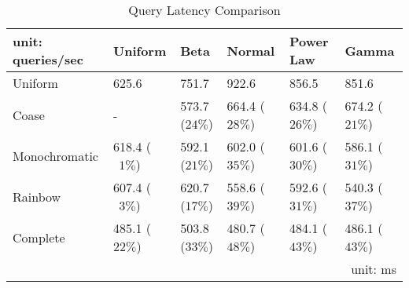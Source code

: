 \begin{table*}[t!]
\centering
\caption{Query Latency Comparison}
\begin{tabular}{llllll}
\toprule
unit: queries/sec &  Uniform &   Beta &  Normal &  Power Law &   Gamma \\
\midrule
Uniform          &   625.6             &  751.7          &  922.6              &    856.5             &  851.6 \\
Coase         &   -                 &  573.7 ($24\%$) &  664.4 ($28\%$)  &    634.8 ($26\%$) &  674.2 ($21\%$) \\
Monochromatic &   618.4 ($\ \ 1\%$) &  592.1 ($21\%$) &  602.0 ($35\%$)  &    601.6 ($30\%$) &  586.1 ($31\%$) \\
Rainbow       &   607.4 ($\ \ 3\%$) &  620.7 ($17\%$) &  558.6 ($39\%$)  &    592.6 ($31\%$) &  540.3 ($37\%$) \\
Complete      &   485.1 ($22\%$)    &  503.8 ($33\%$) &  480.7 ($48\%$)  &    484.1 ($43\%$) &  486.1 ($43\%$) \\
\bottomrule
\multicolumn{6}{r}{unit: ms} 
\end{tabular}
\label{tab:latency_comparison}
\end{table*}
